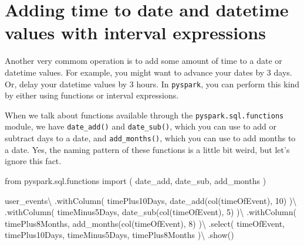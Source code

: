 \documentclass[
  11pt,
  letterpaper,
  DIV=11,
  numbers=noendperiod]{scrreprt}
\newenvironment{Shaded}{\begin{snugshade}}{\end{snugshade}}
\newcommand{\DecValTok}[1]{\textcolor[rgb]{0.68,0.00,0.00}{#1}}
\newcommand{\ImportTok}[1]{\textcolor[rgb]{0.00,0.46,0.62}{#1}}
\newcommand{\NormalTok}[1]{\textcolor[rgb]{0.00,0.23,0.31}{#1}}
\newcommand{\OperatorTok}[1]{\textcolor[rgb]{0.37,0.37,0.37}{#1}}
\newcommand{\StringTok}[1]{\textcolor[rgb]{0.13,0.47,0.30}{#1}}
\begin{document}
\section{Adding time to date and datetime values with interval
expressions}\label{sec-interval-express}

Another very commom operation is to add some amount of time to a date or
datetime values. For example, you might want to advance your dates by 3
days. Or, delay your datetime values by 3 hours. In \texttt{pyspark},
you can perform this kind by either using functions or interval
expressions.

When we talk about functions available through the
\texttt{pyspark.sql.functions} module, we have \texttt{date\_add()} and
\texttt{date\_sub()}, which you can use to add or subtract days to a
date, and \texttt{add\_months()}, which you can use to add months to a
date. Yes, the naming pattern of these functions is a little bit weird,
but let's ignore this fact.

\begin{Shaded}
\begin{Highlighting}[]
\ImportTok{from}\NormalTok{ pyspark.sql.functions }\ImportTok{import}\NormalTok{ (}
\NormalTok{    date\_add,}
\NormalTok{    date\_sub,}
\NormalTok{    add\_months}
\NormalTok{)}

\NormalTok{user\_events}\OperatorTok{\textbackslash{}}
\NormalTok{    .withColumn(}
        \StringTok{\textquotesingle{}timePlus10Days\textquotesingle{}}\NormalTok{,}
\NormalTok{        date\_add(col(}\StringTok{\textquotesingle{}timeOfEvent\textquotesingle{}}\NormalTok{), }\DecValTok{10}\NormalTok{)}
\NormalTok{    )}\OperatorTok{\textbackslash{}}
\NormalTok{    .withColumn(}
        \StringTok{\textquotesingle{}timeMinus5Days\textquotesingle{}}\NormalTok{,}
\NormalTok{        date\_sub(col(}\StringTok{\textquotesingle{}timeOfEvent\textquotesingle{}}\NormalTok{), }\DecValTok{5}\NormalTok{)}
\NormalTok{    )}\OperatorTok{\textbackslash{}}
\NormalTok{    .withColumn(}
        \StringTok{\textquotesingle{}timePlus8Months\textquotesingle{}}\NormalTok{,}
\NormalTok{        add\_months(col(}\StringTok{\textquotesingle{}timeOfEvent\textquotesingle{}}\NormalTok{), }\DecValTok{8}\NormalTok{)}
\NormalTok{    )}\OperatorTok{\textbackslash{}}
\NormalTok{    .select(}
        \StringTok{\textquotesingle{}timeOfEvent\textquotesingle{}}\NormalTok{, }\StringTok{\textquotesingle{}timePlus10Days\textquotesingle{}}\NormalTok{,}
        \StringTok{\textquotesingle{}timeMinus5Days\textquotesingle{}}\NormalTok{, }\StringTok{\textquotesingle{}timePlus8Months\textquotesingle{}}
\NormalTok{    )}\OperatorTok{\textbackslash{}}
\NormalTok{    .show()}
\end{Highlighting}
\end{Shaded}
\end{document}
